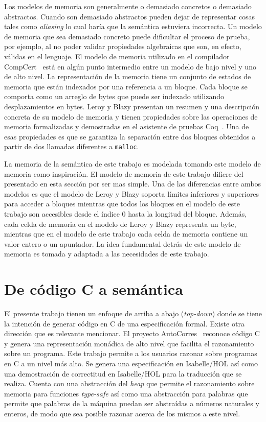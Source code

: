 Los modelos de memoria son generalmente o demasiado concretos o demasiado abstractos.
Cuando son demasiado abstractos pueden dejar de representar cosas tales como \textit{aliasing} lo cual haría que la semántica estuviera incorrecta.
Un modelo de memoria que sea demasiado concreto puede dificultar el proceso de prueba, por ejemplo, al no poder validar propiedades algebraicas que son, en efecto, válidas en el lenguaje.
El modelo de memoria utilizado en el compilador CompCert~\citep{leroy-blazy-memory-model} está en algún punto intermedio entre un modelo de bajo nivel y uno de alto nivel.
La representación de la memoria tiene un conjunto de estados de memoria que están indexados por una referencia a un bloque.
Cada bloque se comporta como un arreglo de bytes que puede ser indexado utilizando desplazamientos en bytes.
Leroy y Blazy presentan un resumen y una descripción concreta de su modelo de memoria y tienen propiedades sobre las operaciones de memoria formalizadas y demostradas en el asistente de pruebas Coq~\citep{coq-doc}.
Una de esas propiedades es que se garantiza la separación entre dos bloques obtenidos a partir de dos llamadas diferentes a \verb|malloc|.

La memoria de la semántica de este trabajo es modelada tomando este modelo de memoria como inspiración.
El modelo de memoria de este trabajo difiere del presentado en esta sección por ser mas simple.
Una de las diferencias entre ambos modelos es que el modelo de Leroy y Blazy soporta límites inferiores y superiores para acceder a bloques mientras que todos los bloques en el modelo de este trabajo son accesibles desde el índice $0$ hasta la longitud del bloque.
Además, cada celda de memoria en el modelo de Leroy y Blazy representa un byte, mientras que en el modelo de este trabajo cada celda de memoria contiene un valor entero o un apuntador.
La idea fundamental detrás de este modelo de memoria es tomada y adaptada a las necesidades de este trabajo.


\section{De código C a semántica}

El presente trabajo tienen un enfoque de arriba a abajo (\textit{top-down}) donde se tiene la intención de generar código en C de una especificación formal.
Existe otra dirección que es relevante mencionar.
El proyecto AutoCorres~\citep{autocorres} reconoce código C y genera una representación monádica de alto nivel que facilita el razonamiento sobre un programa.
Este trabajo permite a los usuarios razonar sobre programas en C a un nivel más alto.
Se genera una especificación en Isabelle/HOL así como una demostración de correctitud en Isabelle/HOL para la traducción que se realiza.
Cuenta con una abstracción del \textit{heap} que permite el razonamiento sobre memoria para funciones \textit{type-safe} así como una abstracción para palabras que permite que palabras de la máquina puedan ser abstraídas a números naturales y enteros, de modo que sea posible razonar acerca de los mismos a este nivel.


